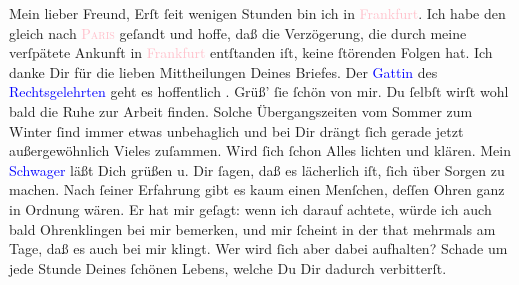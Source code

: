            \pstart\center{}Mein lieber Freund,\pend\pstart
           Erſt ſeit wenigen Stunden bin ich in \textcolor{pink}{Frankfurt}{}\ledrightnote{\textcolor{pink}{Frankfurt am Main}}.
               Ich habe den \label{K_L02823-1v}\label{K_L02823-1h} gleich nach \textsc{\textcolor{pink}{Paris}{}\ledrightnote{\textcolor{pink}{Paris}}} geſandt und hoffe, daß die Verzögerung, die
               durch meine verſpätete Ankunft in \textcolor{pink}{Frankfurt}{}\ledrightnote{\textcolor{pink}{Frankfurt am Main}}
               entſtanden iſt, keine ſtörenden Folgen hat.\pend
           \pstart
           Ich danke Dir für die lieben Mittheilungen Deines Briefes. Der \textcolor{blue}{Gattin}{} des \textcolor{blue}{Rechtsgelehrten}{} geht es hoffentlich \label{K_L02823-2v}\label{K_L02823-2h}. Grüß’ ſie ſchön von mir.\pend
           \pstart
           Du ſelbſt wirſt  wohl bald die  Ruhe zur Arbeit {\pb}finden. Solche Übergangszeiten vom Sommer zum Winter ſind immer etwas unbehaglich
               und bei Dir drängt ſich gerade jetzt außergewöhnlich Vieles zuſammen. Wird ſich ſchon
               Alles lichten und klären.\pend
           \pstart
           Mein \textcolor{blue}{Schwager}{} läßt Dich
               grüßen u. Dir ſagen, daß es lächerlich iſt, ſich über \label{K_L02823-3v}\label{K_L02823-3h} Sorgen zu machen. Nach ſeiner Erfahrung gibt
               es kaum einen Menſchen, deſſen Ohren ganz in Ordnung wären. Er hat mir geſagt: wenn
               ich darauf achtete, würde ich auch bald Ohrenklingen  bei mir bemerken, und mir ſcheint in der that\strikeout{,}
               mehrmals am Tage, daß es auch bei mir klingt. {\pb}Wer
               wird ſich aber dabei aufhalten? Schade um jede Stunde Deines ſchönen Lebens, welche
               Du Dir dadurch verbitterſt.\pend
